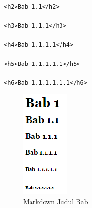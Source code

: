 \begin{itemize}
\begin{lstlisting}[basicstyle=\footnotesize]
<h2>Bab 1.1</h2>

<h3>Bab 1.1.1</h3>

<h4>Bab 1.1.1.1</h4>

<h5>Bab 1.1.1.1.1</h5>

<h6>Bab 1.1.1.1.1.1</h6>
\end{lstlisting}
\begin{figure}[H]
\centering
\includegraphics[scale=1]{Gambar/judulbab.png}
\caption[Markdown Judul Bab]{Markdown Judul Bab}
\label{fig:judulbab}
\end{figure}


\end{itemize}
